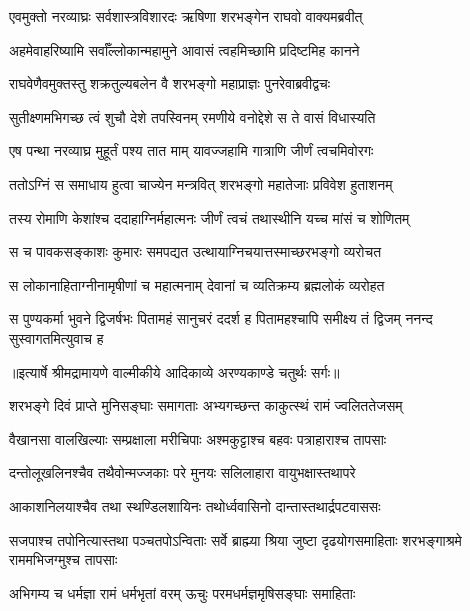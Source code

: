 \twolineshloka
{एवमुक्तो नरव्याघ्रः सर्वशास्त्रविशारदः}
{ऋषिणा शरभङ्गेन राघवो वाक्यमब्रवीत्} %

\twolineshloka
{अहमेवाहरिष्यामि सर्वाँल्लोकान्महामुने}
{आवासं त्वहमिच्छामि प्रदिष्टमिह कानने} %

\twolineshloka
{राघवेणैवमुक्तस्तु शक्रतुल्यबलेन वै}
{शरभङ्गो महाप्राज्ञः पुनरेवाब्रवीद्वचः} %

\twolineshloka
{सुतीक्ष्णमभिगच्छ त्वं शुचौ देशे तपस्विनम्}
{रमणीये वनोद्देशे स ते वासं विधास्यति} %

\twolineshloka
{एष पन्था नरव्याघ्र मुहूर्तं पश्य तात माम्}
{यावज्जहामि गात्राणि जीर्णं त्वचमिवोरगः} %

\twolineshloka
{ततोऽग्निं स समाधाय हुत्वा चाज्येन मन्त्रवित्}
{शरभङ्गो महातेजाः प्रविवेश हुताशनम्} %

\twolineshloka
{तस्य रोमाणि केशांश्च ददाहाग्निर्महात्मनः}
{जीर्णं त्वचं तथास्थीनि यच्च मांसं च शोणितम्} %

\twolineshloka
{स च पावकसङ्काशः कुमारः समपद्यत}
{उत्थायाग्निचयात्तस्माच्छरभङ्गो व्यरोचत} %

\twolineshloka
{स लोकानाहिताग्नीनामृषीणां च महात्मनाम्}
{देवानां च व्यतिक्रम्य ब्रह्मलोकं व्यरोहत} %

\fourlineindentedshloka
{स पुण्यकर्मा भुवने द्विजर्षभः}
{पितामहं सानुचरं ददर्श ह}
{पितामहश्चापि समीक्ष्य तं द्विजम्}
{ननन्द सुस्वागतमित्युवाच ह} %


{॥इत्यार्षे श्रीमद्रामायणे वाल्मीकीये आदिकाव्ये अरण्यकाण्डे चतुर्थः सर्गः॥}


\twolineshloka
{शरभङ्गे दिवं प्राप्ते मुनिसङ्घाः समागताः}
{अभ्यगच्छन्त काकुत्स्थं रामं ज्वलिततेजसम्} %

\twolineshloka
{वैखानसा वालखिल्याः सम्प्रक्षाला मरीचिपाः}
{अश्मकुट्टाश्च बहवः पत्राहाराश्च तापसाः} %

\twolineshloka
{दन्तोलूखलिनश्चैव तथैवोन्मज्जकाः परे}
{मुनयः सलिलाहारा वायुभक्षास्तथापरे} %

\twolineshloka
{आकाशनिलयाश्चैव तथा स्थण्डिलशायिनः}
{तथोर्ध्ववासिनो दान्तास्तथार्द्रपटवाससः} %

\threelineshloka
{सजपाश्च तपोनित्यास्तथा पञ्चतपोऽन्विताः}
{सर्वे ब्राह्म्या श्रिया जुष्टा दृढयोगसमाहिताः}
{शरभङ्गाश्रमे राममभिजग्मुश्च तापसाः} %

\twolineshloka
{अभिगम्य च धर्मज्ञा रामं धर्मभृतां वरम्}
{ऊचुः परमधर्मज्ञमृषिसङ्घाः समाहिताः} %

